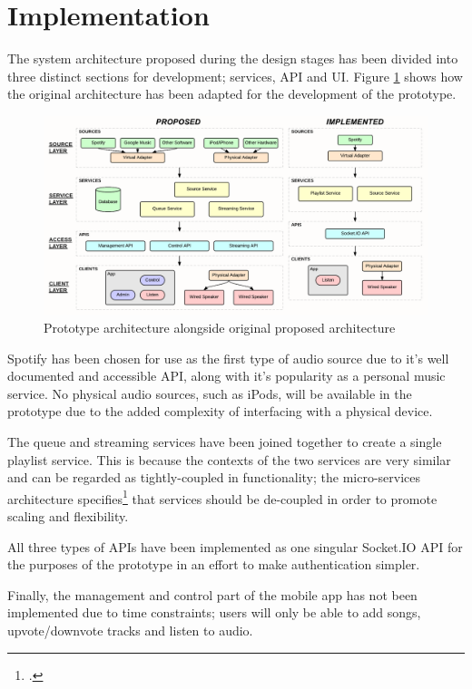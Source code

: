 \section{Implementation}
The system architecture proposed during the design stages has been divided into three distinct sections for development; services, API and UI. Figure \ref{fig:architecture-changes} shows how the original architecture has been adapted for the development of the prototype.

\begin{figure}[h!]
  \centering
  \includegraphics[width=1.02\textwidth]{./img/architecture-changes.png}
  \caption{Prototype architecture alongside original proposed architecture}
  \label{fig:architecture-changes}
\end{figure}

Spotify has been chosen for use as the first type of audio source due to it's well documented and accessible API, along with it's popularity as a personal music service. No physical audio sources, such as iPods, will be available in the prototype due to the added complexity of interfacing with a physical device.

The queue and streaming services have been joined together to create a single playlist service. This is because the contexts of the two services are very similar and can be regarded as tightly-coupled in functionality; the micro-services architecture specifies\footcite{microservicesio} that services should be de-coupled in order to promote scaling and flexibility.

All three types of APIs have been implemented as one singular Socket.IO API for the purposes of the prototype in an effort to make authentication simpler.

Finally, the management and control part of the mobile app has not been implemented due to time constraints; users will only be able to add songs, upvote/downvote tracks and listen to audio.

